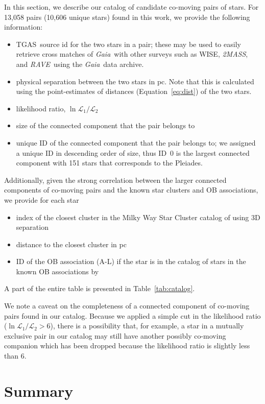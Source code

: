 \documentclass[manuscript, letterpaper]{aastex6}
\newcommand{\project}[1]{\textsl{#1}}
\newcommand{\acronym}[1]{{\small{#1}}}
\newcommand{\gaia}{\project{Gaia}}
\newcommand{\rave}{\project{\acronym{RAVE}}}
\newcommand{\tmass}{\project{\acronym{2MASS}}}
\newcommand{\eqname}{Equation}
\newcommand{\tgas}{\acronym{TGAS}}
\begin{document}
In this section, we describe our catalog of candidate co-moving pairs of stars.
For 13,058 pairs (10,606 unique stars) found in this work,
we provide the following information:
%
\begin{itemize}
  \item \tgas\ source id for the two stars in a pair; these may be used to easily
    retrieve cross matches of \gaia\ with other surveys such as WISE, \tmass, and
    \rave\ using the \gaia\ data archive.
  \item physical separation between the two stars in pc. Note that this is calculated
    using the point-estimates of distances (\eqname~\ref{eq:dist}) of the two stars.
  \item likelihood ratio, $\ln \mathcal{L}_1 /\mathcal{L}_2$
  \item size of the connected component that the pair belongs to
  \item unique ID of the connected component that the pair belongs to; we assigned
    a unique ID in descending order of size, thus ID~0 is the largest connected component with 151 stars that corresponds to the Pleiades.
\end{itemize}
%
Additionally, given the strong correlation between the larger connected components
of co-moving pairs
and the known star clusters and OB associations, we provide for each star
%
\begin{itemize}
  \item index of the closest cluster in the Milky Way Star Cluster catalog of
  \citet{Kharchenko:2016aa} using 3D separation
  \item distance to the closest cluster in pc
  \item ID of the OB association (A-L) if the star is in the catalog of
  stars in the known OB associations by \citet{de-Zeeuw:1999aa}
\end{itemize}
%
A part of the entire table is presented in Table~\ref{tab:catalog}.



We note a caveat on the completeness of a connected component of co-moving
pairs found in our catalog. Because we applied a simple cut in the likelihood
ratio ($\ln \mathcal{L}_1 /\mathcal{L}_2>6$), there is a possibility that, for
example, a star in a mutually exclusive pair in our catalog may still have
another possibly co-moving companion which has been dropped because the
likelihood ratio is slightly less than 6.

\section{Summary}\label{sec:summary}
\end{document}
